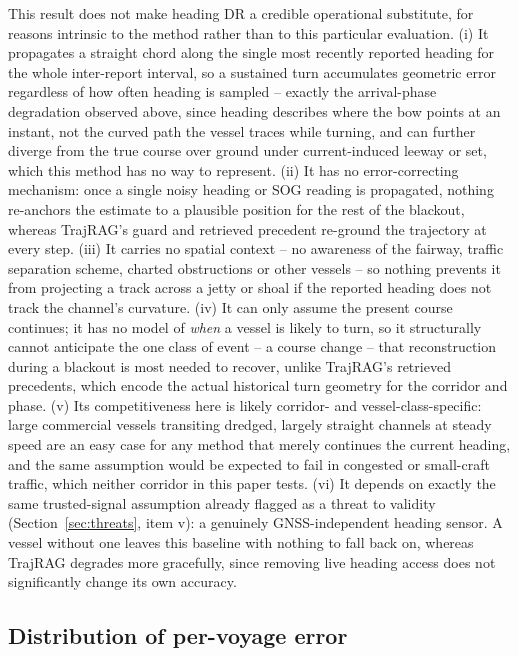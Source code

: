 This result does not make heading DR a credible operational substitute,
for reasons intrinsic to the method rather than to this particular
evaluation. (i) It propagates a straight chord along the single most
recently reported heading for the whole inter-report interval, so a
sustained turn accumulates geometric error regardless of how often heading
is sampled -- exactly the arrival-phase degradation observed above, since
heading describes where the bow points at an instant, not the curved path
the vessel traces while turning, and can further diverge from the true
course over ground under current-induced leeway or set, which this method
has no way to represent. (ii) It has no error-correcting mechanism: once a
single noisy heading or SOG reading is propagated, nothing re-anchors the
estimate to a plausible position for the rest of the blackout, whereas
TrajRAG's guard and retrieved precedent re-ground the trajectory at every
step. (iii) It carries no spatial context -- no awareness of the fairway,
traffic separation scheme, charted obstructions or other vessels -- so
nothing prevents it from projecting a track across a jetty or shoal if the
reported heading does not track the channel's curvature. (iv) It can only
assume the present course continues; it has no model of \emph{when} a
vessel is likely to turn, so it structurally cannot anticipate the one
class of event -- a course change -- that reconstruction during a blackout
is most needed to recover, unlike TrajRAG's retrieved precedents, which
encode the actual historical turn geometry for the corridor and phase. (v)
Its competitiveness here is likely corridor- and vessel-class-specific:
large commercial vessels transiting dredged, largely straight channels at
steady speed are an easy case for any method that merely continues the
current heading, and the same assumption would be expected to fail in
congested or small-craft traffic, which neither corridor in this paper
tests. (vi) It depends on exactly the same trusted-signal assumption
already flagged as a threat to validity (Section~\ref{sec:threats}, item
v): a genuinely GNSS-independent heading sensor. A vessel without one
leaves this baseline with nothing to fall back on, whereas TrajRAG degrades
more gracefully, since removing live heading access does not significantly
change its own accuracy.

\subsection{Distribution of per-voyage error}
\label{sec:distribution}

